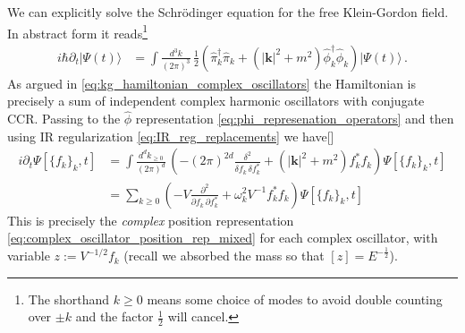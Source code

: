 \documentclass[../QFT_main.tex]{subfiles}
\begin{document}
\begin{mytheorem}
We can explicitly solve the Schrödinger equation for the free Klein-Gordon field.
In abstract form it reads\footnote{\label{fn:double_counting_k_geq_0}The shorthand $k\geq 0$ means some choice of modes to avoid double counting over $\pm k$ and the factor $\tfrac{1}{2}$ will cancel.}
\begin{align}
    i \hbar \partial_t |\Psi(t)\rangle &= \int \frac{d^3k}{(2\pi)^3}\, \tfrac{1}{2} \left( \hat{\pi}_k^\dagger \hat{\pi}_{k} + (|\mathbf{k}|^2 + m^2) \hat{\phi}_k^\dagger \hat{\phi}_{k} \right) |\Psi(t)\rangle\,.
\end{align}
As argued in \eqref{eq:kg_hamiltonian_complex_oscillators} the Hamiltonian is precisely a sum of independent complex harmonic oscillators with conjugate CCR.
Passing to the $\hat{\phi}$ representation \eqref{eq:phi_represenation_operators} and then using IR regularization \eqref{eq:IR_reg_replacements} we have[]
\begin{align}
    i \partial_t\Psi[\{f_k\}_k, t] &= \int \frac{d^dk_{\geq 0}}{(2\pi)^d}\, \left( - (2\pi)^{2d}\frac{\delta^2}{\delta f_k \,\delta f_k^*} + (|\mathbf{k}|^2 + m^2) f_{k}^* f_k \right) \Psi[\{f_k\}_k, t]
    \\
    & =\sum_{k \geq 0} \left( - V\frac{\partial^2}{\partial f_k \,\partial f_k^*} + \omega_k^2 V^{-1} f_{k}^* f_k \right) \Psi[\{f_k\}_k, t]
\end{align}
This is precisely the \emph{complex} position representation \eqref{eq:complex_oscillator_position_rep_mixed} for each complex oscillator, with variable $z:= V^{-1/2} f_k$ (recall we absorbed the mass so that $[z]=E^{-\frac{1}{2}}$).


\end{mytheorem}
\end{document}

